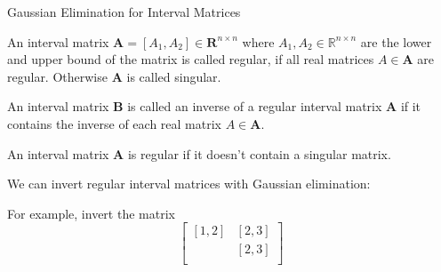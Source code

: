 \documentclass[german,10pt,xcolor=colortbl,compress]{beamer}
\begin{document}
\begin{frame}{Gaussian Elimination for Interval Matrices}
    \begin{definition}
        An interval matrix $\mathbf{A}=[A_1,A_2] \in \mathbf{R}^{n \times n} $ where $A_1,
        A_2 \in \mathbb{R}^{n\times n}$ are the lower and upper bound of the matrix is
        called regular, if all real matrices $A \in \mathbf{A}$ are regular. Otherwise
        $\mathbf{A} $ is called singular.

        An interval matrix $\mathbf B$ is called an inverse of a regular interval matrix
        $\mathbf{A} $ if it contains the inverse of each real matrix $A \in \mathbf{A}$.

        An interval matrix $\mathbf A$ is regular if it doesn't contain a singular matrix.
    \end{definition}
    \pause
    We can invert regular interval matrices with Gaussian elimination:

    For example, invert the matrix
    \[
    \left[
    \begin{array}{cc}
    [1,2]&[2,3] \\

    [0,0]&[2,3]\\
    \end{array}
    \right]
    \]

\end{frame}
\end{document}
